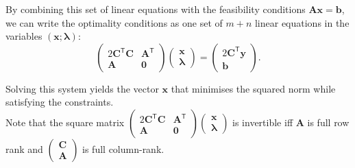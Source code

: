 By combining this set of linear equations with the feasibility conditions $\mathbf{A}\mathbf{x} = \mathbf{b}$, we can write the optimality conditions as one set of $m+n$ linear equations in the variables $(\mathbf{x}; \boldsymbol{\lambda})$:
\[
\begin{pmatrix}
2\mathbf{C}^\mathsf{T}\mathbf{C} & \mathbf{A}^\mathsf{T} \\
\mathbf{A} & \mathbf{0}
\end{pmatrix}
\begin{pmatrix}
\mathbf{x} \\
\boldsymbol{\lambda}
\end{pmatrix}
=
\begin{pmatrix}
2\mathbf{C}^\mathsf{T}\mathbf{y} \\
\mathbf{b}
\end{pmatrix}.
\]

Solving this system yields the vector $\mathbf{x}$ that minimises the squared norm while satisfying the constraints.\\

Note that the square matrix $\begin{pmatrix}
2\mathbf{C}^\mathsf{T}\mathbf{C} & \mathbf{A}^\mathsf{T} \\
\mathbf{A} & \mathbf{0}
\end{pmatrix}
\begin{pmatrix}
\mathbf{x} \\
\boldsymbol{\lambda}
\end{pmatrix}$ is invertible iff \textbf{A} is full row rank and $\begin{pmatrix}
    \textbf{C}\\ \textbf{A} 
\end{pmatrix}$ is full column-rank.






